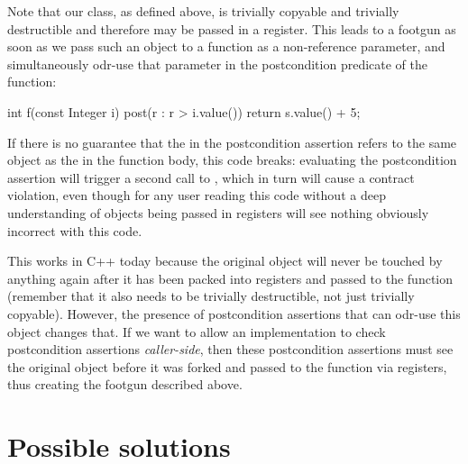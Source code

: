 Note that our  class, as defined above, is trivially copyable and trivially destructible and therefore may be passed in a register. This leads to a footgun as soon as we pass such an object to a function as a non-reference parameter, and simultaneously odr-use that parameter in the postcondition predicate of the function: 
 \begin{codeblock}
int f(const Integer i)
post(r : r > i.value()) {
  return s.value() + 5;
}
 \end{codeblock}
If there is no guarantee that the  in the postcondition assertion refers to the same object as the  in the function body, this code breaks: evaluating the postcondition assertion will trigger a second call to , which in turn will cause a contract violation, even though for any user reading this code without a deep understanding of objects being passed in registers will see nothing obviously incorrect with this code.


This works in C++ today because the original object will never be touched by anything again after it has been packed into registers and passed to the function (remember that it also needs to be trivially destructible, not just trivially copyable). However, the presence of postcondition assertions that can odr-use this object changes that. If we want to allow an implementation to check postcondition assertions \emph{caller-side}, then these postcondition assertions must see the original object before it was forked and passed to the function via registers, thus creating the footgun described above.

\section{Possible solutions}

